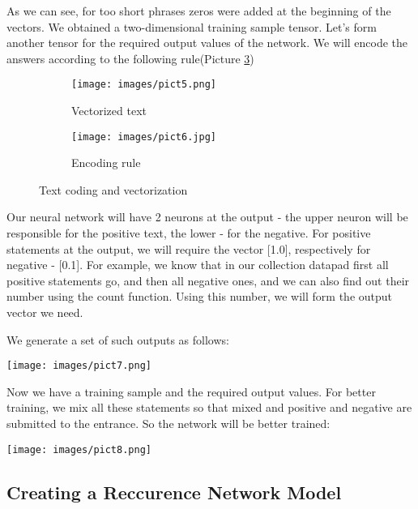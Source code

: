 \documentclass[]{article}
\begin{document}
As we can see, for too short phrases zeros were added at the beginning of the vectors. We obtained a two-dimensional training sample tensor. Let's form another tensor for the required output values  of the network. We will encode the answers according to the following rule(Picture \ref{fig:figure3})

\clearpage

\begin{figure}
\begin{subfigure}{0.4\textwidth}
\texttt{[image: images/pict5.png]}
\caption{Vectorized text}
\label{fig:figure2}
\end{subfigure}
\begin{subfigure}{0.6\textwidth}
\texttt{[image: images/pict6.jpg]}
\caption{Encoding rule}
\label{fig:figure3}
\end{subfigure}
\caption{Text coding and vectorization}
\end{figure}

Our neural network will have 2 neurons at the output - the upper neuron will be responsible for the positive text, the lower - for the negative. For positive statements at the output, we will require the vector [1.0], respectively for negative - [0.1]. For example, we know that in our collection data\underline{\hspace{1mm}}pad first all positive statements go, and then all negative ones, and we can also find out their number using the count function. Using this number, we will form the output vector we need.

We generate a set of such outputs as follows:

\vspace{2mm}
\texttt{[image: images/pict7.png]}

\vspace{2mm}
Now we have a training sample and the required output values. For better training, we mix all these statements so that mixed and positive and negative are submitted to the entrance. So the network will be better trained:

\vspace{2mm}
\texttt{[image: images/pict8.png]}

\vspace{3mm}
\subsection{Creating a Reccurence Network Model}
\end{document}
